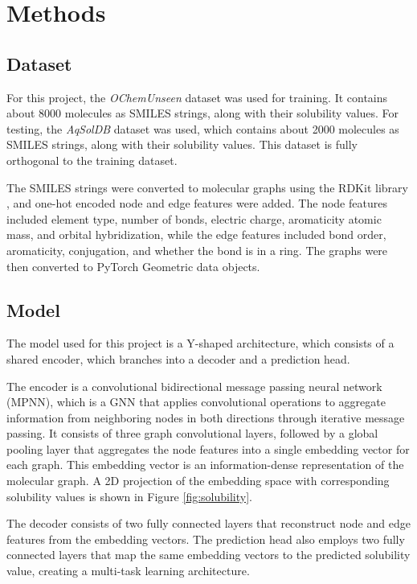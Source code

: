 \documentclass[11pt,a4paper]{article}
\begin{document}
\section{Methods}
\subsection{Dataset}

For this project, the \textit{OChemUnseen} dataset \cite{llompart2024will} was used for training. It contains about 8000 molecules as SMILES strings, along with their solubility values. For testing, the \textit{AqSolDB} dataset \cite{sorkun2019aqsoldb} was used, which contains about 2000 molecules as SMILES strings, along with their solubility values. This dataset is fully orthogonal to the training dataset.

The SMILES strings were converted to molecular graphs using the RDKit library \cite{rdkit}, and one-hot encoded node and edge features were added. The node features included element type, number of bonds, electric charge, aromaticity atomic mass, and orbital hybridization, while the edge features included bond order, aromaticity, conjugation, and whether the bond is in a ring. The graphs were then converted to PyTorch Geometric data objects.

\subsection{Model}

The model used for this project is a Y-shaped architecture, which consists of a shared encoder, which branches into a decoder and a prediction head.

The encoder is a convolutional bidirectional message passing neural network (MPNN), which is a GNN that applies convolutional operations to aggregate information from neighboring nodes in both directions through iterative message passing. It consists of three graph convolutional layers, followed by a global pooling layer that aggregates the node features into a single embedding vector for each graph. This embedding vector is an information-dense representation of the molecular graph. A 2D projection of the embedding space with corresponding solubility values is shown in Figure \ref{fig:solubility}.

The decoder consists of two fully connected layers that reconstruct node and edge features from the embedding vectors. The prediction head also employs two fully connected layers that map the same embedding vectors to the predicted solubility value, creating a multi-task learning architecture.
\end{document}
